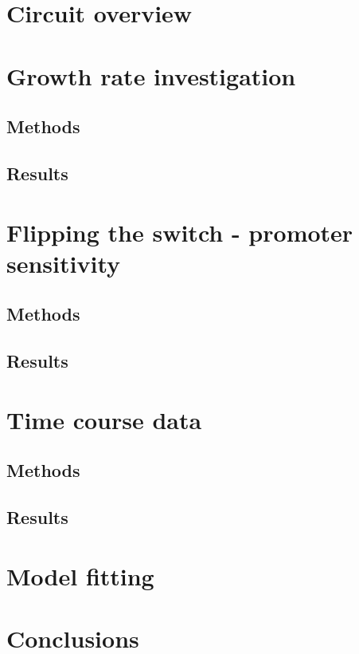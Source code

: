 \section{Circuit overview}

\section{Growth rate investigation}
\subsection{Methods}
\subsection{Results}

\section{Flipping the switch - promoter sensitivity}
\subsection{Methods}
\subsection{Results}
\section{Time course data}
\subsection{Methods}
\subsection{Results}
\section{Model fitting}
\section{Conclusions}
